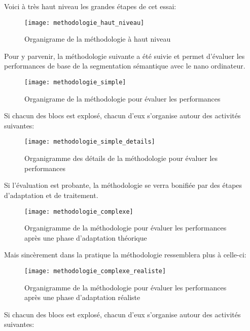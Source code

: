 ﻿\par Voici à très haut niveau les grandes étapes de cet essai:
\label{methodologie_haut_niveau}
\begin{figure}[H]
    \centering
    \texttt{[image: methodologie\_haut\_niveau]}
    \caption{Organigrame de la méthodologie à haut niveau}
    \label{fig:methodologie_haut_niveau}
\end{figure}
\par Pour y parvenir, la méthodologie suivante a été suivie et permet d'évaluer les performances de base de la segmentation sémantique avec le nano ordinateur.
\label{methodologie_simple}
\begin{figure}[H]
    \centering
    \texttt{[image: methodologie\_simple]}
    \caption{Organigrame de la méthodologie pour évaluer les performances}
    \label{fig:methodologie_simple}
\end{figure}
\par Si chacun des blocs est explosé, chacun d'eux s'organise autour des activités suivantes: 
\label{methodologie_simple_details}
\begin{figure}[H]
    \centering
    \texttt{[image: methodologie\_simple\_details]}
    \caption{Organigramme des détails de la méthodologie pour évaluer les performances}
    \label{fig:methodologie_simple_details}
\end{figure}
\par Si l'évaluation est probante, la méthodologie se verra bonifiée par des étapes d'adaptation et de traitement. 
\label{methodologie_complexe}
\begin{figure}[H]
    \centering
    \texttt{[image: methodologie\_complexe]}
    \caption{Organigramme de la méthodologie pour évaluer les performances après une phase d'adaptation théorique}
    \label{fig:methodologie_complexe}
\end{figure}
\par Mais sincèrement dans la pratique la méthodologie ressemblera plus à celle-ci: 
\label{methodologie_complexe_realiste}
\begin{figure}[H]
    \centering
    \texttt{[image: methodologie\_complexe\_realiste]}
    \caption{Organigramme de la méthodologie pour évaluer les performances après une phase d'adaptation réaliste}
    \label{fig:methodologie_complexe_realiste}
\end{figure}
\par Si chacun des blocs est explosé, chacun d'eux s'organise autour des activités suivantes: 
